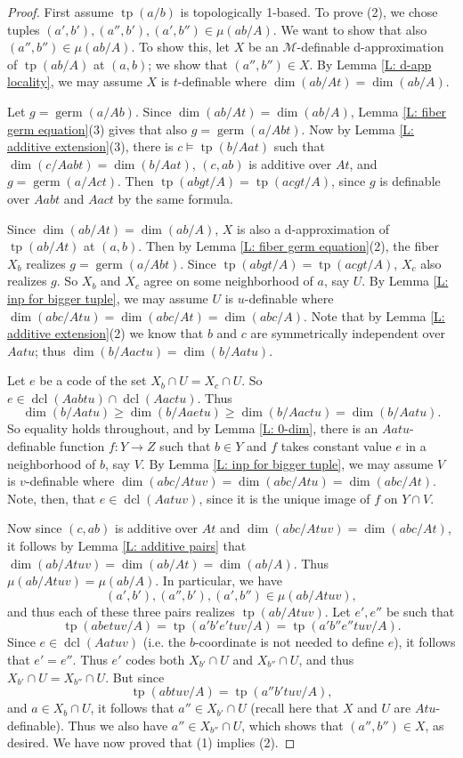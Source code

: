 \documentclass{amsart}
\theoremstyle{definition}
\newcommand{\dcl}{\operatorname{dcl}}
\newcommand{\tp}{\operatorname{tp}}
\begin{document}
\begin{proof}
    First assume $\tp(a/b)$ is topologically 1-based. To prove (2), we chose tuples $(a',b'),(a'',b'),(a',b'')\in\mu(ab/A)$. We want to show that also $(a'',b'')\in\mu(ab/A)$. To show this, let $X$ be an $\mathcal M$-definable d-approximation of $\tp(ab/A)$ at $(a,b)$; we show that $(a'',b'')\in X$. By Lemma \ref{L: d-app locality}, we may assume $X$ is $t$-definable where $\dim(ab/At)=\dim(ab/A)$.

    Let $g=\operatorname{germ}(a/Ab)$. Since $\dim(ab/At)=\dim(ab/A)$, Lemma \ref{L: fiber germ equation}(3) gives that also $g=\operatorname{germ}(a/Abt)$. Now by Lemma \ref{L: additive extension}(3), there is $c\models\tp(b/Aat)$ such that $\dim(c/Aabt)=\dim(b/Aat)$, $(c,ab)$ is additive over $At$, and $g=\operatorname{germ}(a/Act)$. Then $\tp(abgt/A)=\tp(acgt/A)$, since $g$ is definable over $Aabt$ and $Aact$ by the same formula. 

    Since $\dim(ab/At)=\dim(ab/A)$, $X$ is also a d-approximation of $\tp(ab/At)$ at $(a,b)$. Then by Lemma \ref{L: fiber germ equation}(2), the fiber $X_b$ realizes $g=\operatorname{germ}(a/Abt)$. Since $\tp(abgt/A)=\tp(acgt/A)$, $X_c$ also realizes $g$. So $X_b$ and $X_c$ agree on some neighborhood of $a$, say $U$. By Lemma \ref{L: inp for bigger tuple}, we may assume $U$ is $u$-definable where $\dim(abc/Atu)=\dim(abc/At)=\dim(abc/A)$. Note that by Lemma \ref{L: additive extension}(2) we know that $b$ and $c$ are symmetrically independent over $Aatu$; thus $\dim(b/Aactu)=\dim(b/Aatu)$.

    Let $e$ be a code of the set $X_b\cap U=X_c\cap U$. So $e\in\dcl(Aabtu)\cap\dcl(Aactu)$. Thus $$\dim(b/Aatu)\ge \dim(b/Aaetu)\geq\dim(b/Aactu)=\dim(b/Aatu).$$ So equality holds throughout, and by Lemma \ref{L: 0-dim}, there is an $Aatu$-definable function $f:Y\rightarrow Z$ such that $b\in Y$ and $f$ takes constant value $e$ in a neighborhood of $b$, say $V$. By Lemma \ref{L: inp for bigger tuple}, we may assume $V$ is $v$-definable where $\dim(abc/Atuv)=\dim(abc/Atu)=\dim(abc/At)$. Note, then, that $e\in\dcl(Aatuv)$, since it is the unique image of $f$ on $Y\cap V$.

    Now since $(c,ab)$ is additive over $At$ and $\dim(abc/Atuv)=\dim(abc/At)$, it follows by Lemma \ref{L: additive pairs} that $\dim(ab/Atuv)=\dim(ab/At)=\dim(ab/A)$. Thus $\mu(ab/Atuv)=\mu(ab/A)$. In particular, we have $$(a',b'),(a'',b'),(a',b'')\in\mu(ab/Atuv),$$ and thus each of these three pairs realizes $\tp(ab/Atuv)$. Let $e',e''$ be such that $$\tp(abetuv/A)=\tp(a'b'e'tuv/A)=\tp(a'b''e''tuv/A).$$ Since $e\in\dcl(Aatuv)$ (i.e. the $b$-coordinate is not needed to define $e$), it follows that $e'=e''$. Thus $e'$ codes both $X_{b'}\cap U$ and $X_{b''}\cap U$, and thus $X_{b'}\cap U=X_{b''}\cap U$. But since $$\tp(abtuv/A)=\tp(a''b'tuv/A),$$ and $a\in X_b\cap U$, it follows that $a''\in X_{b'}\cap U$ (recall here that $X$ and $U$ are $Atu$-definable). Thus we also have $a''\in X_{b''}\cap U$, which shows that $(a'',b'')\in X$, as desired. We have now proved that (1) implies (2).


\end{proof}
\end{document}
